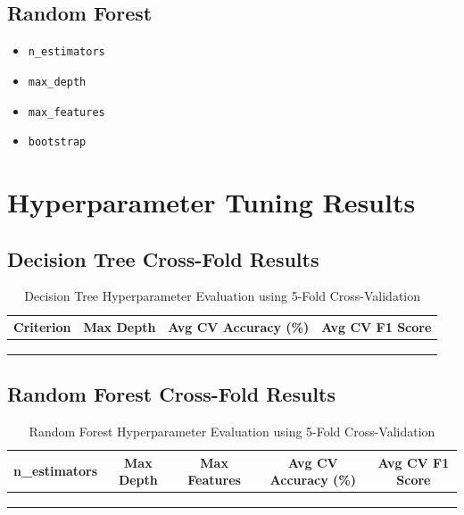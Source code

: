 \documentclass[11pt]{article}
\begin{document}
\subsection*{Random Forest}
\begin{itemize}
    \item \texttt{n\_estimators}
    \item \texttt{max\_depth}
    \item \texttt{max\_features}
    \item \texttt{bootstrap}
\end{itemize}


\section*{Hyperparameter Tuning Results}

\subsection*{Decision Tree Cross-Fold Results}
\begin{table}[h!]
\centering
\caption{Decision Tree Hyperparameter Evaluation using 5-Fold Cross-Validation}
\begin{tabular}{cccc}
\toprule
Criterion & Max Depth & Avg CV Accuracy (\%) & Avg CV F1 Score \\
\midrule
 &  &  &  \\
 &  &  &  \\
 &  &  &  \\
\bottomrule
\end{tabular}
\end{table}

\subsection*{Random Forest Cross-Fold Results}
\begin{table}[h!]
\centering
\caption{Random Forest Hyperparameter Evaluation using 5-Fold Cross-Validation}
\begin{tabular}{ccccc}
\toprule
n\_estimators & Max Depth & Max Features & Avg CV Accuracy (\%) & Avg CV F1 Score \\
\midrule
 &  &  &  &  \\
 &  &  &  &  \\
 &  &  &  &  \\
\bottomrule
\end{tabular}
\end{table}
\end{document}
